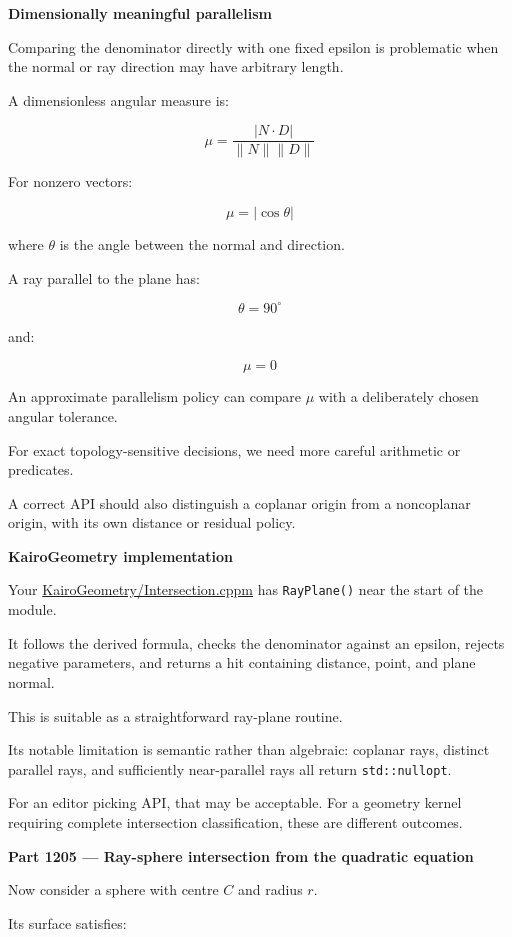 \textbf{Dimensionally meaningful parallelism}

Comparing the denominator directly with one fixed epsilon is problematic when the normal or ray direction may have arbitrary length.

A dimensionless angular measure is:

\[
\boxed{ \mu= \frac{|N\cdot D|}{\|N\|\|D\|} }
\]

For nonzero vectors:

\[
\mu=|\cos\theta|
\]

where \(\theta\) is the angle between the normal and direction.

A ray parallel to the plane has:

\[
\theta=90^\circ
\]

and:

\[
\mu=0
\]

An approximate parallelism policy can compare \(\mu\) with a deliberately chosen angular tolerance.

For exact topology-sensitive decisions, we need more careful arithmetic or predicates.

A correct API should also distinguish a coplanar origin from a noncoplanar origin, with its own distance or residual policy.

\textbf{KairoGeometry implementation}

Your \href{https://github.com/swayam8624/KairoGeometry/blob/master/Intersection.cppm?utm_source=chatgpt.com}{KairoGeometry/Intersection.cppm} has \texttt{RayPlane()} near the start of the module.

It follows the derived formula, checks the denominator against an epsilon, rejects negative parameters, and returns a hit containing distance, point, and plane normal.

This is suitable as a straightforward ray-plane routine.

Its notable limitation is semantic rather than algebraic: coplanar rays, distinct parallel rays, and sufficiently near-parallel rays all return \texttt{std::nullopt}.

For an editor picking API, that may be acceptable. For a geometry kernel requiring complete intersection classification, these are different outcomes.

\textbf{Part 1205 --- Ray-sphere intersection from the quadratic equation}

Now consider a sphere with centre \(C\) and radius \(r\).

Its surface satisfies:

